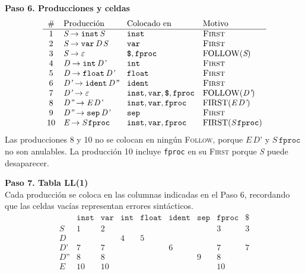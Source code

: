 \documentclass[12pt,letterpaper]{article}
\newcommand{\nt}[1]{\textit{#1}}
\newcommand{\tk}[1]{\texttt{#1}}
\newcommand{\First}[1]{\mathrm{FIRST}(#1)}
\newcommand{\Follow}[1]{\mathrm{FOLLOW}(#1)}
\newcommand{\eps}{\varepsilon}
\begin{document}
\begin{enumerate}[label=\arabic*.]
\begin{itemize}
    \textbf{Paso 6. Producciones y celdas}
    \[
    \begin{array}{c l l l}
      \# & \text{Producción} & \text{Colocado en} & \text{Motivo} \\ \hline
      1  & \nt{S}\to\tk{inst}\,\nt{S} & \tk{inst} & \text{\textsc{First}} \\
      2  & \nt{S}\to\tk{var}\,\nt{D}\,\nt{S} & \tk{var} & \text{\textsc{First}} \\
      3  & \nt{S}\to\eps & \tk{\$},\tk{fproc} & \Follow{\nt{S}} \\
      4  & \nt{D}\to\tk{int}\,\nt{D'} & \tk{int} & \text{\textsc{First}} \\
      5  & \nt{D}\to\tk{float}\,\nt{D'} & \tk{float} & \text{\textsc{First}} \\
      6  & \nt{D'}\to\tk{ident}\,\nt{D''} & \tk{ident} & \text{\textsc{First}} \\
      7  & \nt{D'}\to\eps & \tk{inst},\tk{var},\tk{\$},\tk{fproc} & \Follow{\nt{D'}} \\
      8  & \nt{D''}\to\nt{E}\,\nt{D'} & \tk{inst},\tk{var},\tk{fproc} & \First{\nt{E}\,\nt{D'}} \\
      9  & \nt{D''}\to\tk{sep}\,\nt{D'} & \tk{sep} & \text{\textsc{First}} \\
      10 & \nt{E}\to\nt{S}\,\tk{fproc} & \tk{inst},\tk{var},\tk{fproc} & \First{\nt{S}\,\tk{fproc}}
    \end{array}
    \]
    Las producciones 8 y 10 no se colocan en ningún \textsc{Follow}, porque $\nt{E}\,\nt{D'}$ y
    $\nt{S}\,\tk{fproc}$ no son anulables. La producción 10 incluye \tk{fproc} en su \textsc{First} porque
    \nt{S} puede desaparecer.

    \bigskip

    \textbf{Paso 7. Tabla LL(1)}\\
    Cada producción se coloca en las columnas indicadas en el Paso 6, recordando que las celdas vacías
    representan errores sintácticos.
    \[
    \begin{array}{c|c|c|c|c|c|c|c|c}
      & \tk{inst} & \tk{var} & \tk{int} & \tk{float} & \tk{ident} & \tk{sep} & \tk{fproc} & \tk{\$} \\ \hline
      \nt{S}   & 1  & 2  &   &   &   &   & 3  & 3 \\ \hline
      \nt{D}   &    &    & 4 & 5 &   &   &    &   \\ \hline
      \nt{D'}  & 7  & 7  &   &   & 6 &   & 7  & 7 \\ \hline
      \nt{D''} & 8  & 8  &   &   &   & 9 & 8  &   \\ \hline
      \nt{E}   & 10 & 10 &   &   &   &   & 10 &
    \end{array}
    \]


\end{itemize}
\end{enumerate}
\end{document}
